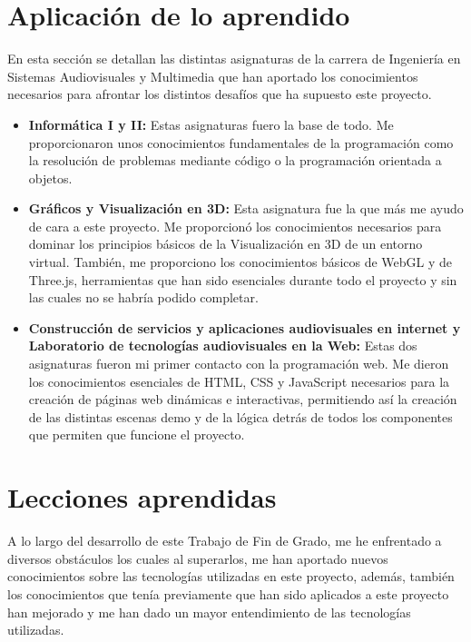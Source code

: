 \documentclass[a4paper, 12pt]{book}
\begin{document}
\section{Aplicación de lo aprendido}
\label{sec:aplicacion}

En esta sección se detallan las distintas asignaturas de la carrera de Ingeniería en Sistemas Audiovisuales y Multimedia que han aportado los conocimientos necesarios para afrontar los distintos desafíos que ha supuesto este proyecto. 

\begin{itemize}
  \item \textbf{Informática I y II:} Estas asignaturas fuero la base de todo. Me proporcionaron unos conocimientos fundamentales de la programación como la resolución de problemas mediante código o la programación orientada a objetos.
  \item \textbf{Gráficos y Visualización en 3D:} Esta asignatura fue la que más me ayudo de cara a este proyecto. Me proporcionó los conocimientos necesarios para dominar los principios básicos de la Visualización en 3D de un entorno virtual. También, me proporciono los conocimientos básicos de WebGL y de Three.js, herramientas que han sido esenciales durante todo el proyecto y sin las cuales no se habría podido completar. 
  \item \textbf{Construcción de servicios y aplicaciones audiovisuales en internet y Laboratorio de tecnologías audiovisuales en la Web:} Estas dos asignaturas fueron mi primer contacto con la programación web. Me dieron los conocimientos esenciales de HTML, CSS y JavaScript necesarios para la creación de páginas web dinámicas e interactivas, permitiendo así la creación de las distintas escenas demo y de la lógica detrás de todos los componentes que permiten que funcione el proyecto.
\end{itemize}

\section{Lecciones aprendidas}
\label{sec:lecciones_aprendidas}

A lo largo del desarrollo de este Trabajo de Fin de Grado, me he enfrentado a diversos obstáculos los cuales al superarlos, me han aportado nuevos conocimientos sobre las tecnologías utilizadas en este proyecto, además, también los conocimientos que tenía previamente que han sido aplicados a este proyecto han mejorado y me han dado un mayor entendimiento de las tecnologías utilizadas.
\end{document}
